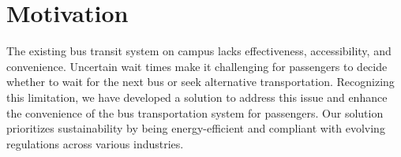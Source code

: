 \chapter{Motivation}

The existing bus transit system on campus lacks effectiveness, accessibility, and convenience. Uncertain wait times make it challenging for passengers to decide whether to wait for the next bus or seek alternative transportation. Recognizing this limitation, we have developed a solution to address this issue and enhance the convenience of the bus transportation system for passengers. Our solution prioritizes sustainability by being energy-efficient and compliant with evolving regulations across various industries.
